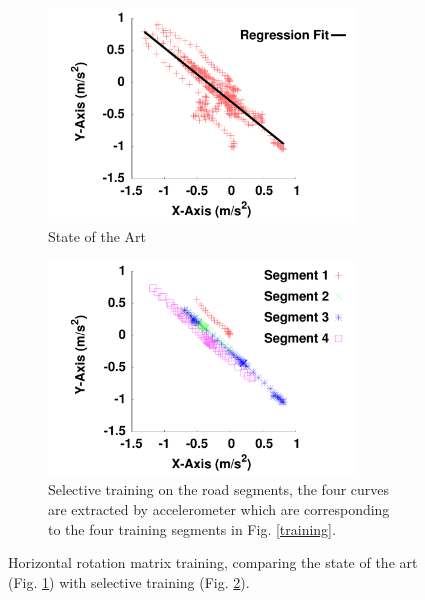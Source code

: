\begin{figure}[!tbph] \centering
    \begin{subfigure}[b]{\linewidth}    
    \begin{center}
	\includegraphics[width=3.2in,angle=0]{Figs/SlopeAware/stateoftheart.pdf}
        \caption{State of the Art}
        \label{direction:a}    
\end{center}
    \end{subfigure} 
    \begin{subfigure}[b]{\linewidth}
    \begin{center}
    \includegraphics[width=3.2in,angle=0]{Figs/SlopeAware/direction.pdf}
         \caption{Selective training on the road segments, the four curves are extracted 
	 by accelerometer which are corresponding to the four training segments in Fig. \ref{training}.}
        \label{direction:b}
    \end{center}
    \end{subfigure} %
   \caption{Horizontal rotation matrix training, comparing 
  the state of the art (Fig. \ref{direction:a}) with selective training (Fig. \ref{direction:b}).}
\label{direction}
\vspace{-0.3cm}
\end{figure}



